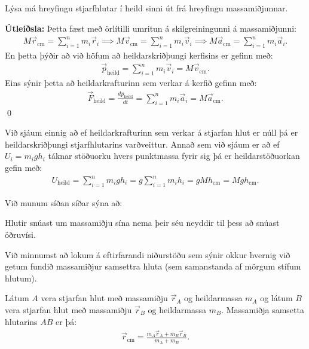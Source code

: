 \ifdefined \wholebook \else\documentclass[oneside]{book}\usepackage{EdlBook}\graphicspath{{figures/}}
\begin{document}
\begin{tcolorbox}
\begin{theorem}
Lýsa má hreyfingu stjarfhlutar í heild sinni út frá hreyfingu massamiðjunnar.
\end{theorem}
\end{tcolorbox}

\textbf{Útleiðsla:} Þetta fæst með örlítilli umritun á skilgreiningunni á massamiðjunni:
\begin{align*}
    M\vec{r}_{\text{cm}} = \sum_{i=1}^{n} m_i \vec{r}_i \implies M \vec{v}_{\text{cm}} = \sum_{i=1}^{n} m_i \vec{v}_i \implies  M \vec{a}_{\text{cm}} = \sum_{i=1}^{n} m_i \vec{a}_i.
\end{align*}
En þetta þýðir að við höfum að heildarskriðþungi kerfisins er gefinn með:
\begin{align*}
    \vec{p}_{\text{heild}} = \sum_{i=1}^{n} m_i \vec{v}_i = M\vec{v}_{\text{cm}}.
\end{align*}
Eins sýnir þetta að heildarkrafturinn sem verkar á kerfið gefinn með:
\begin{align*}
    \vec{F}_{\text{heild}} = \frac{dp_{\text{heild}}}{dt} = \sum_{i=1}^{n} m_i \vec{a}_i = M\vec{a}_{\text{cm}}.
\end{align*}
\qed

Við sjáum einnig að ef heildarkrafturinn sem verkar á stjarfan hlut er núll þá er heildarskriðþungi stjarfhlutarins varðveittur. Annað sem við sjáum er að ef $U_i = m_igh_i$ táknar stöðuorku hvers punktmassa fyrir sig þá er heildarstöðuorkan gefin með:
\begin{align*}
    U_{\text{heild}} = \sum_{i=1}^{n} m_igh_i = g \sum_{i=1}^{n}m_i h_i = g Mh_{\text{cm}} = Mgh_{\text{cm}}.
\end{align*}

Við munum síðan síðar sýna að:

\begin{tcolorbox}
\begin{theorem}
Hlutir snúast um massamiðju sína nema þeir séu neyddir til þess að snúast öðruvísi.
\end{theorem}
\end{tcolorbox}

Við minnumst að lokum á eftirfarandi niðurstöðu sem sýnir okkur hvernig við getum fundið massamiðjur samsettra hluta (sem samanstanda af mörgum stífum hlutum).


\begin{tcolorbox}
\begin{theorem}
Látum $A$ vera stjarfan hlut með massamiðju $\vec{r}_A$ og heildarmassa $m_A$ og látum $B$ vera stjarfan hlut með massamiðju $\vec{r}_B$ og heildarmassa $m_B$. Massamiðja samsetta hlutarins $AB$ er þá:
\begin{align*}
    \vec{r}_{\text{cm}} = \frac{m_A \vec{r}_A+m_B\vec{r}_B}{m_A + m_B}.
\end{align*}
\end{theorem}
\end{tcolorbox}
\end{document}
